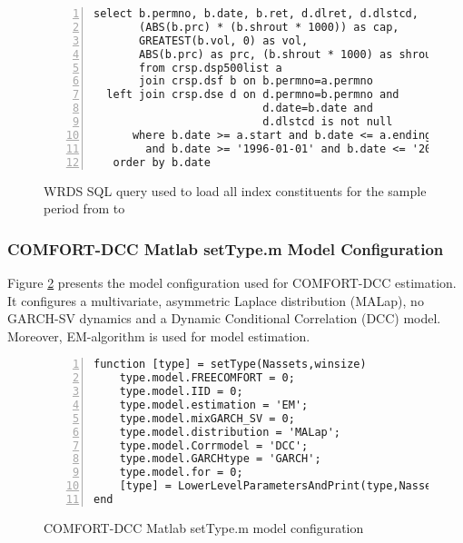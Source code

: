 \documentclass[11pt,a4paper]{article}
\begin{document}
\begin{figure}[H]
\begin{samepage}
\begin{lstlisting}[numbers=left]
select b.permno, b.date, b.ret, d.dlret, d.dlstcd,
	   (ABS(b.prc) * (b.shrout * 1000)) as cap,
	   GREATEST(b.vol, 0) as vol,
	   ABS(b.prc) as prc, (b.shrout * 1000) as shrout
       from crsp.dsp500list a
       join crsp.dsf b on b.permno=a.permno
  left join crsp.dse d on d.permno=b.permno and
                          d.date=b.date and
                          d.dlstcd is not null
      where b.date >= a.start and b.date <= a.ending
        and b.date >= '1996-01-01' and b.date <= '2013-12-31'
   order by b.date
\end{lstlisting}
\end{samepage}
\caption{WRDS SQL query used to load all \indexName{} index constituents for the sample period from \periodFrom{} to \periodTo{}}
\label{figure:wrds_data_query_appendix}
\end{figure}




\subsubsection{COMFORT-DCC Matlab setType.m Model Configuration}

Figure \ref{figure:COMFORT-DCC_setType_appendix} presents the model configuration used for COMFORT-DCC estimation. It configures a multivariate, asymmetric Laplace distribution (MALap), no GARCH-SV dynamics and a Dynamic Conditional Correlation (DCC) model. Moreover, EM-algorithm is used for model estimation.

\begin{figure}[H]
\begin{samepage}
\begin{lstlisting}[numbers=left]
function [type] = setType(Nassets,winsize)
    type.model.FREECOMFORT = 0;
    type.model.IID = 0;
    type.model.estimation = 'EM';
    type.model.mixGARCH_SV = 0;
    type.model.distribution = 'MALap';
    type.model.Corrmodel = 'DCC';
    type.model.GARCHtype = 'GARCH';
    type.model.for = 0;
    [type] = LowerLevelParametersAndPrint(type,Nassets,winsize);
end
\end{lstlisting}
\end{samepage}
\caption{COMFORT-DCC Matlab setType.m model configuration}
\label{figure:COMFORT-DCC_setType_appendix}
\end{figure}
\end{document}
